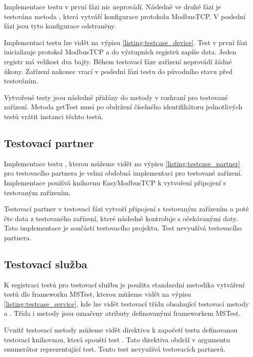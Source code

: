Implementace testu  v první fázi nic neprovádí. Následně ve druhé fázi je testována metoda , která vytváří konfigurace protokolu ModbusTCP. V poslední fázi jsou tyto konfigurace odstraněny.  

Implementaci testu  lze vidět na výpisu \ref{listing:testcase_device}. Test v první fázi inicializuje protokol ModbusTCP a do výstupních registrů zapíše data. Jeden registr má velikost dva bajty. Během testovací fáze zařízení neprovádí žádné úkony. Zařízení nakonec vrací v poslední fázi testu do původního stavu před testováním.

Vytvořené testy jsou následně přidány do metody  v rozhraní pro testované zařízení. Metoda getTest musí po obdržení číselného identifikátoru jednotlivých testů vrátit instanci těchto testů.


\subsection{Testovací partner}
Implementace testu , kterou můžeme vidět na výpisu \ref{listing:testcase_partner} pro testovacího partnera je velmi obdobná implementaci pro testované zařízení. Implementace používá knihovnu EasyModbusTCP k vytvoření připojení s testovaným zařízením. 

Testovací partner v testovací fázi vytvoří připojení s testovaným zařízením a poté čte data z testovaného zařízení, které následně kontroluje s očekávanými daty. Tato implementace je součástí testovacího projektu. Test  nevyužívá testovacího partnera.


\subsection{Testovací služba}

K registraci testů pro testovací službu je použita standardní metodika vytváření testů dle frameworku MSTest, kterou můžeme vidět na výpisu \ref{listing:testcase_service}, kde lze vidět testovací třídu  obsahující testovací metody  a . Třída i metody jsou označeny atributy definovanými frameworkem MSTest. 

Uvnitř testovací metody  můžeme vidět direktivu k započetí testu definovanou testovací knihovnou, která spouští test . Tato direktiva obdrží v argumentu enumerátor reprezentující test. Tento test nevyužívá testovacích partnerů. 

